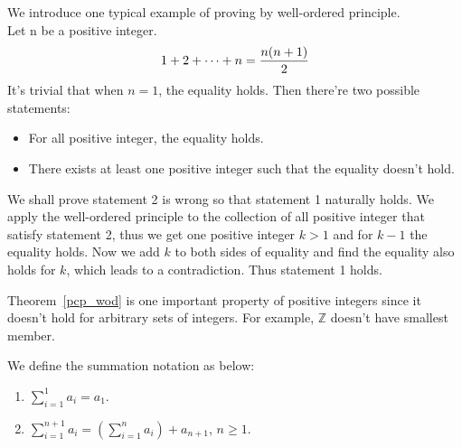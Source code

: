 	\begin{exampleenv}
		We introduce one typical example of proving by well-ordered principle.\\ Let n be a positive integer.
		\begin{equation}
			1+2+\cdots+n=\frac{n(n+1)}{2}\notag
		\end{equation}
		It's trivial that when $n=1$, the equality holds. Then there're two possible statements:
		\begin{itemize}
			\item For all positive integer, the equality holds.
			\item There exists at least one positive integer such that the equality doesn't hold.
		\end{itemize}
		We shall prove statement 2 is wrong so that statement 1 naturally holds. We apply the well-ordered principle to the collection of all positive integer that satisfy statement 2, thus we get one positive integer $k>1$ and for $k-1$ the equality holds. Now we add $k$ to both sides of equality and find the equality also holds for $k$, which leads to a contradiction. Thus statement 1 holds.
	\end{exampleenv}
	\begin{remarkenv}
		Theorem~\ref{pcp_wod} is one important property of positive integers since it doesn't hold for arbitrary sets of integers. For example, $\mathbb{Z}$ doesn't have smallest member.
	\end{remarkenv}
	\begin{notationenv}
		We define the summation notation as below:
		\begin{enumerate}
			\item $\displaystyle\sum_{i=1}^1a_i=a_1$.
			\item $\displaystyle\sum_{i=1}^{n+1}a_{i}=\left(\sum\limits_{i=1}^n a_i \right) + a_{n+1}$, $n\ge 1$.
		\end{enumerate}
	\end{notationenv}
